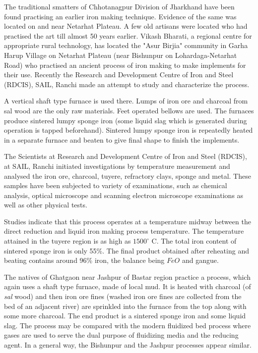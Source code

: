 \vspace{-.2cm}

The traditional smatters of Chhotanagpur Division of Jharkhand have been found practising an earlier iron making technique. Evidence of the same was located on and near Netarhat Plateau. A few old artisans were located who had practised the art till almost 50 years earlier. Vikash Bharati, a regional centre for appropriate rural technology, has located the "Asur Birjia" community in Garha Harup Village on Netarhat Plateau (near Bishunpur on Lohardaga-Netarhat Road) who practised an ancient process of iron making to make implements for their use. Recently the Research and Development Centre of Iron and Steel (RDCIS), SAIL, Ranchi made an attempt to study and characterize the process.

A vertical shaft type furnace is used there. Lumps of iron ore and charcoal from sal wood are the only raw materials. Feet operated bellows are used. The furnaces produce sintered lumpy sponge iron (some liquid slag which is generated during operation is tapped beforehand). Sintered lumpy sponge iron is repeatedly heated in a separate furnace and beaten to give final shape to finish the implements. 
\medskip

The Scientists at Research and Development Centre of Iron and Steel (RDCIS), at SAIL, Ranchi initiated investigations by temperature measurement and analysed the iron ore, charcoal, tuyere, refractory clays, sponge and metal. These samples have been subjected to variety of examinations, such as chemical analysis, optical microscope and scanning electron microscope examinations as well as other physical tests.

Studies indicate that this process operates at a temperature midway between the direct reduction and liquid iron making process temperature. The temperature attained in the tuyere region is as high as $1500^\circ$ C. The total iron content of sintered sponge iron is only 55\%. The final product obtained after reheating and beating contains around 96\% iron, the balance being $FeO$ and gangue. 

The natives of Ghatgaon near Jashpur of Bastar region practice a process, which again uses a shaft type furnace, made of local mud. It is heated with charcoal (of {\it sal} wood) and then iron ore fines (washed iron ore fines are collected from the bed of an adjacent river) are sprinkled into the furnace from the top along with some more charcoal. The end product is a sintered sponge iron and some liquid slag. The process may be compared with the modern fluidized bed process where gases are used to serve the dual purpose of fluidizing media and the reducing agent. In a general way, the Bishunpur and the Jashpur processes appear similar.


